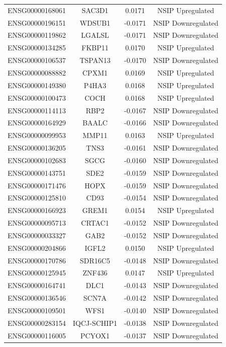 \documentclass[
]{article}
\begin{document}
\begin{singlespace}
\begin{longtable}[t]{lccc}
ENSG00000168061 & SAC3D1 & 0.0171 & NSIP Upregulated\\
\addlinespace
ENSG00000196151 & WDSUB1 & -0.0171 & NSIP Downregulated\\
ENSG00000119862 & LGALSL & -0.0171 & NSIP Downregulated\\
ENSG00000134285 & FKBP11 & 0.0170 & NSIP Upregulated\\
ENSG00000106537 & TSPAN13 & -0.0170 & NSIP Downregulated\\
ENSG00000088882 & CPXM1 & 0.0169 & NSIP Upregulated\\
\addlinespace
ENSG00000149380 & P4HA3 & 0.0168 & NSIP Upregulated\\
ENSG00000100473 & COCH & 0.0168 & NSIP Upregulated\\
ENSG00000114113 & RBP2 & -0.0167 & NSIP Downregulated\\
ENSG00000164929 & BAALC & -0.0166 & NSIP Downregulated\\
ENSG00000099953 & MMP11 & 0.0163 & NSIP Upregulated\\
\addlinespace
ENSG00000136205 & TNS3 & -0.0161 & NSIP Downregulated\\
ENSG00000102683 & SGCG & -0.0160 & NSIP Downregulated\\
ENSG00000143751 & SDE2 & -0.0159 & NSIP Downregulated\\
ENSG00000171476 & HOPX & -0.0159 & NSIP Downregulated\\
ENSG00000125810 & CD93 & -0.0154 & NSIP Downregulated\\
\addlinespace
ENSG00000166923 & GREM1 & 0.0154 & NSIP Upregulated\\
ENSG00000095713 & CRTAC1 & -0.0152 & NSIP Downregulated\\
ENSG00000033327 & GAB2 & -0.0152 & NSIP Downregulated\\
ENSG00000204866 & IGFL2 & 0.0150 & NSIP Upregulated\\
ENSG00000170786 & SDR16C5 & -0.0148 & NSIP Downregulated\\
\addlinespace
ENSG00000125945 & ZNF436 & 0.0147 & NSIP Upregulated\\
ENSG00000164741 & DLC1 & -0.0143 & NSIP Downregulated\\
ENSG00000136546 & SCN7A & -0.0142 & NSIP Downregulated\\
ENSG00000109501 & WFS1 & -0.0140 & NSIP Downregulated\\
ENSG00000283154 & IQCJ-SCHIP1 & -0.0138 & NSIP Downregulated\\
\addlinespace
ENSG00000116005 & PCYOX1 & -0.0137 & NSIP Downregulated\\

\end{longtable}
\end{singlespace}
\end{document}
